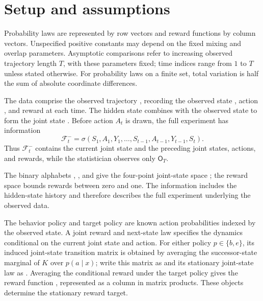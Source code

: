 \documentclass[11pt]{article}
\begin{document}
\section{Setup and assumptions}

Probability laws are represented by row vectors and reward functions by column vectors. Unspecified positive constants may depend on the fixed mixing and overlap parameters. Asymptotic comparisons refer to increasing observed trajectory length \(T\), with these parameters fixed; time indices range from \(1\) to \(T\) unless stated otherwise. For probability laws on a finite set, total variation is half the sum of absolute coordinate differences.

The data comprise the observed trajectory , recording the observed state , action , and reward  at each time. The hidden state  combines with the observed state to form the joint state . Before action \(A_t\) is drawn, the full experiment has information
\[
\mathcal F_t^-=\sigma(S_1,A_1,Y_1,\ldots,S_{t-1},A_{t-1},Y_{t-1},S_t).
\]
Thus \(\mathcal F_t^-\) contains the current joint state and the preceding joint states, actions, and rewards, while the statistician observes only \(\mathsf O_T\).

The binary alphabets , , and  give the four-point joint-state space ; the reward space  bounds rewards between zero and one. The information  includes the hidden-state history and therefore describes the full experiment underlying the observed data.

The behavior policy  and target policy  are known action probabilities indexed by the observed state. A joint reward and next-state law  specifies the dynamics conditional on the current joint state and action. For either policy \(p\in\{b,e\}\), its induced joint-state transition matrix is obtained by averaging the successor-state marginal of \(K\) over \(p(a\mid x)\); write this matrix as  and its stationary joint-state law as . Averaging the conditional reward under the target policy gives the reward function , represented as a column in matrix products. These objects determine the stationary reward target.
\end{document}
